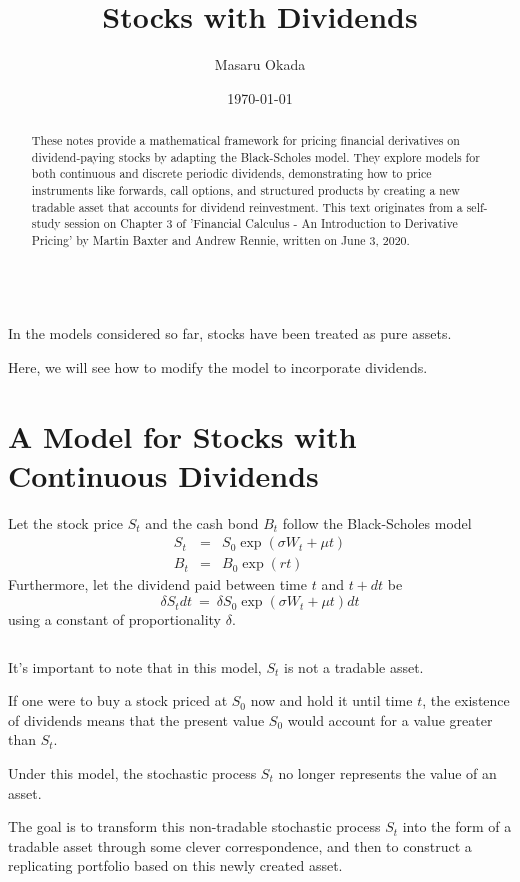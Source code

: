 \documentclass[uplatex,a4j,12pt,dvipdfmx]{jsarticle}
\title{Stocks with Dividends}
\author{Masaru Okada
}
\date{ \today }
\begin{document}
\maketitle

\begin{abstract}
	These notes provide a mathematical framework for pricing financial derivatives on dividend-paying stocks by adapting the Black-Scholes model. They explore models for both continuous and discrete periodic dividends, demonstrating how to price instruments like forwards, call options, and structured products by creating a new tradable asset that accounts for dividend reinvestment. This text originates from a self-study session on Chapter 3 of 'Financial Calculus - An Introduction to Derivative Pricing' by Martin Baxter and Andrew Rennie, written on June 3, 2020.
\end{abstract}

\ \\

In the models considered so far, stocks have been treated as pure assets.

Here, we will see how to modify the model to incorporate dividends.

\section{A Model for Stocks with Continuous Dividends}
Let the stock price $S_{t}$ and the cash bond $B_{t}$ follow the Black-Scholes model
%
\begin{eqnarray*}
	S_{t}
	&=&
	S_{0} \exp (\sigma W_{t} + \mu t )
	\\
	B_{t}
	&=&
	B_{0} \exp (rt)
\end{eqnarray*}
%
Furthermore, let the dividend paid between time $t$ and $t+dt$ be
$$
	\delta S_{t} dt
	\ = \
	\delta S_{0} \exp (\sigma W_{t} + \mu t ) dt
$$
using a constant of proportionality $\delta$.

${}$

It's important to note that in this model, $S_{t}$ is not a tradable asset.

If one were to buy a stock priced at $S_{0}$ now and hold it until time $t$, the existence of dividends means that the present value $S_{0}$ would account for a value greater than $S_{t}$.

Under this model, the stochastic process $S_{t}$ no longer represents the value of an asset.
${}$

The goal is to transform this non-tradable stochastic process $S_{t}$ into the form of a tradable asset through some clever correspondence, and then to construct a replicating portfolio based on this newly created asset.
\end{document}
